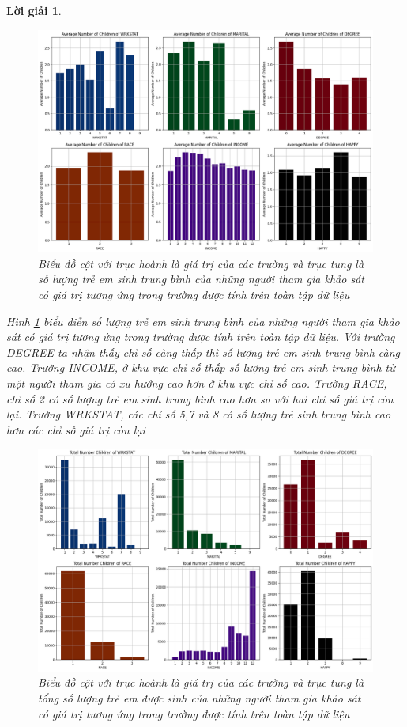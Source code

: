 \documentclass[14pt, a4paper]{article}
\theoremstyle{sltheorem}
\theoremstyle{soltheorem}
\newtheorem*{loigiai}{Lời giải}
\begin{document}
\begin{loigiai}
    \begin{figure}[H]
        \centering
        \includegraphics[width=0.7\linewidth]{figures/overall_avg_child_field.png}
        \caption{Biểu đồ cột với trục hoành là giá trị của các trường và trục tung là số lượng trẻ em sinh trung bình của những người tham gia khảo sát có giá trị tương ứng trong trường được tính trên toàn tập dữ liệu}
        \label{fig:overall_avg_child_field}
    \end{figure}

    Hình \ref{fig:overall_avg_child_field} biểu diễn số lượng trẻ em sinh trung bình của những người tham gia khảo sát có giá trị tương ứng trong trường được tính trên toàn tập dữ liệu.
    Với trường DEGREE ta nhận thấy chỉ số càng thấp thì số lượng trẻ em sinh trung bình càng cao.
    Trường INCOME, ở khu vực chỉ số thấp số lượng trẻ em sinh trung bình từ một người tham gia có xu hướng cao hơn ở khu vực chỉ số cao.
    Trường RACE, chỉ số 2 có số lượng trẻ em sinh trung bình cao hơn so với hai chỉ số giá trị còn lại.
    Trường WRKSTAT, các chỉ số 5,7 và 8 có số lượng trẻ sinh trung bình cao hơn các chỉ số giá trị còn lại

    \begin{figure}[H]
        \centering
        \includegraphics[width=0.7\linewidth]{figures/overall_total_child_field.png}
        \caption{Biểu đồ cột với trục hoành là giá trị của các trường và trục tung là tổng số lượng trẻ em được sinh của những người tham gia khảo sát có giá trị tương ứng trong trường được tính trên toàn tập dữ liệu}
        \label{fig:overall_total_child_field}
    \end{figure}


\end{loigiai}
\end{document}
